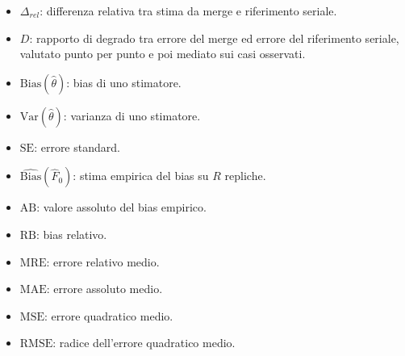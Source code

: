 \begin{itemize}
    \item $\Delta_{rel}$: differenza relativa tra stima da merge e riferimento seriale.
    \item $D$: rapporto di degrado tra errore del merge ed errore del riferimento seriale, valutato punto per punto e poi mediato sui casi osservati.
    \item $\mathrm{Bias}(\hat{\theta})$: bias di uno stimatore.
    \item $\mathrm{Var}(\hat{\theta})$: varianza di uno stimatore.
    \item $\mathrm{SE}$: errore standard.
    \item $\widehat{\mathrm{Bias}}(\hat{F}_0)$: stima empirica del bias su $R$ repliche.
    \item $\mathrm{AB}$: valore assoluto del bias empirico.
    \item $\mathrm{RB}$: bias relativo.
    \item $\mathrm{MRE}$: errore relativo medio.
    \item $\mathrm{MAE}$: errore assoluto medio.
    \item $\mathrm{MSE}$: errore quadratico medio.
    \item $\mathrm{RMSE}$: radice dell'errore quadratico medio.
\end{itemize}
